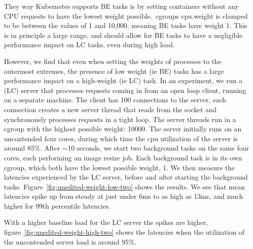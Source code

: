 They way Kubernetes supports BE tasks is by setting containers without any CPU
requests to have the lowest weight possible.\ cgroups cpu.weight is clamped to
be between the values of 1 and 10,000, meaning BE tasks have weight 1. This is
in principle a large range, and should allow for BE tasks to have a negligible
performance impact on LC tasks, even during high load. 

However, we find that even when setting the weights of processes to the
outermost extremes, the presence of low weight (ie BE) tasks has a large
performance impact on a high-weight (ie LC) task. In an experiment, we run a
(LC) server that processes requests coming in from an open loop client, running
on a separate machine. The client has 100 connections to the server, each
connection creates a new server thread that reads from the socket and
synchronously processes requests in a tight loop. The server threads run in a
cgroup with the highest possible weight: 10000. The server initially runs on an
uncontended four cores, during which time the cpu utilization of the server is
around 85\%. After $\sim$10 seconds, we start two background tasks on the same
four cores, each performing an image resize job. Each background task is in its
own cgroup, which both have the lowest possible weight, 1. We then measure the
latencies experienced by the LC server, before and after starting the background
tasks. Figure~\ref{fig:unedited-weight-low-two} shows the results. We see that
mean latencies spike up from steady at just under 6ms to as high as 13ms, and
much higher for 99th percentile latencies.

With a higher baseline load for the LC server the spikes are higher,
figure~\ref{fig:unedited-weight-high-two} shows the latencies when the
utilization of the uncontended server load is around 95\%.








